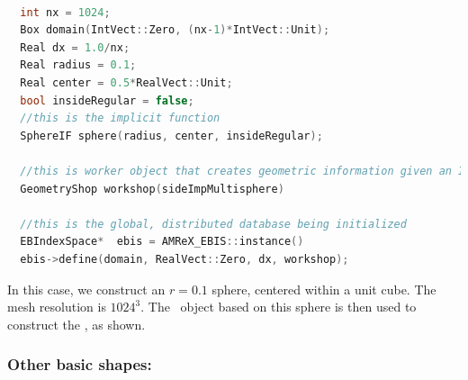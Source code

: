 \begin{lstlisting}[language=cpp]

  int nx = 1024;
  Box domain(IntVect::Zero, (nx-1)*IntVect::Unit);
  Real dx = 1.0/nx;
  Real radius = 0.1;
  Real center = 0.5*RealVect::Unit;
  bool insideRegular = false;
  //this is the implicit function
  SphereIF sphere(radius, center, insideRegular);

  //this is worker object that creates geometric information given an IF
  GeometryShop workshop(sideImpMultisphere)

  //this is the global, distributed database being initialized
  EBIndexSpace*  ebis = AMReX_EBIS::instance()
  ebis->define(domain, RealVect::Zero, dx, workshop);

\end{lstlisting}

In this case, we construct an $r=0.1$ sphere, centered within a unit cube.  The mesh resolution is $1024^3$.
The \geom\ object based on this sphere is then used to construct the \ebis, as shown.

\subsubsection{Other basic shapes:}

